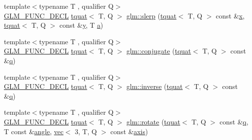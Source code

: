 \begin{DoxyCompactItemize}
\item 
{\footnotesize template$<$typename T , qualifier Q$>$ }\\\mbox{\hyperlink{setup_8hpp_ab2d052de21a70539923e9bcbf6e83a51}{G\+L\+M\+\_\+\+F\+U\+N\+C\+\_\+\+D\+E\+CL}} \mbox{\hyperlink{structglm_1_1tquat}{tquat}}$<$ T, Q $>$ \mbox{\hyperlink{group__gtc__quaternion_ga3796542dac06014d541d67ebd5f2a88a}{glm\+::slerp}} (\mbox{\hyperlink{structglm_1_1tquat}{tquat}}$<$ T, Q $>$ const \&\mbox{\hyperlink{_s_d_l__opengl_8h_ad0e63d0edcdbd3d79554076bf309fd47}{x}}, \mbox{\hyperlink{structglm_1_1tquat}{tquat}}$<$ T, Q $>$ const \&\mbox{\hyperlink{_s_d_l__opengl_8h_a1675d9d7bb68e1657ff028643b4037e3}{y}}, T \mbox{\hyperlink{_s_d_l__opengl__glext_8h_a3309789fc188587d666cda5ece79cf82}{a}})
\item 
{\footnotesize template$<$typename T , qualifier Q$>$ }\\\mbox{\hyperlink{setup_8hpp_ab2d052de21a70539923e9bcbf6e83a51}{G\+L\+M\+\_\+\+F\+U\+N\+C\+\_\+\+D\+E\+CL}} \mbox{\hyperlink{structglm_1_1tquat}{tquat}}$<$ T, Q $>$ \mbox{\hyperlink{group__gtc__quaternion_gac40833db608deda477f018767b9a1cad}{glm\+::conjugate}} (\mbox{\hyperlink{structglm_1_1tquat}{tquat}}$<$ T, Q $>$ const \&\mbox{\hyperlink{_s_d_l__opengl_8h_a8fc1e7b9baaae687804c7eed46ca09c6}{q}})
\item 
{\footnotesize template$<$typename T , qualifier Q$>$ }\\\mbox{\hyperlink{setup_8hpp_ab2d052de21a70539923e9bcbf6e83a51}{G\+L\+M\+\_\+\+F\+U\+N\+C\+\_\+\+D\+E\+CL}} \mbox{\hyperlink{structglm_1_1tquat}{tquat}}$<$ T, Q $>$ \mbox{\hyperlink{group__gtc__quaternion_gadc59b59ce71daa5586a64a6acf36c072}{glm\+::inverse}} (\mbox{\hyperlink{structglm_1_1tquat}{tquat}}$<$ T, Q $>$ const \&\mbox{\hyperlink{_s_d_l__opengl_8h_a8fc1e7b9baaae687804c7eed46ca09c6}{q}})
\item 
{\footnotesize template$<$typename T , qualifier Q$>$ }\\\mbox{\hyperlink{setup_8hpp_ab2d052de21a70539923e9bcbf6e83a51}{G\+L\+M\+\_\+\+F\+U\+N\+C\+\_\+\+D\+E\+CL}} \mbox{\hyperlink{structglm_1_1tquat}{tquat}}$<$ T, Q $>$ \mbox{\hyperlink{group__gtc__quaternion_ga21c6e3b6104c9b8116a35ddf2ac4d358}{glm\+::rotate}} (\mbox{\hyperlink{structglm_1_1tquat}{tquat}}$<$ T, Q $>$ const \&\mbox{\hyperlink{_s_d_l__opengl_8h_a8fc1e7b9baaae687804c7eed46ca09c6}{q}}, T const \&\mbox{\hyperlink{_s_d_l__opengl__glext_8h_a9e06c1f76a20fed54ca742cd25cb02c4}{angle}}, \mbox{\hyperlink{structglm_1_1vec}{vec}}$<$ 3, T, Q $>$ const \&\mbox{\hyperlink{group__gtc__quaternion_gaaf2707d3081789ce097daaa6e54d5287}{axis}})

\end{DoxyCompactItemize}
